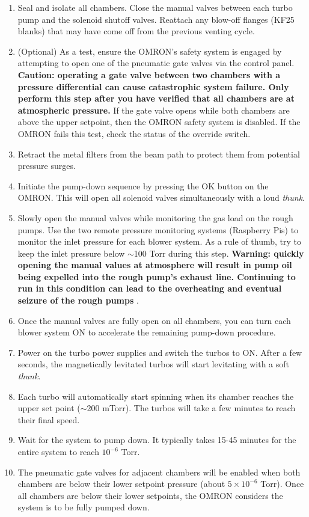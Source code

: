 \begin{enumerate}
	\item Seal and isolate all chambers. Close the manual valves between each turbo pump and the solenoid shutoff valves. Reattach any blow-off flanges (KF25 blanks) that may have come off from the previous venting cycle.
	\item (Optional) As a test, ensure the OMRON's safety system is engaged by attempting to open one of the pneumatic gate valves via the control panel. \textbf{Caution: operating a gate valve between two chambers with a pressure differential can cause catastrophic system failure. Only perform this step after you have verified that all chambers are at atmospheric pressure.} If the gate valve opens while both chambers are above the upper setpoint, then the OMRON safety system is disabled. If the OMRON fails this test, check the status of the override switch.
	\item Retract the metal filters from the beam path to protect them from potential pressure surges. 
	\item Initiate the pump-down sequence by pressing the OK button on the OMRON. This will open all solenoid valves simultaneously with a loud \textit{thunk}.
	\item Slowly open the manual valves while monitoring the gas load on the rough pumps. Use the two remote pressure monitoring systems (Raspberry Pis) to monitor the inlet pressure for each blower system. As a rule of thumb, try to keep the inlet pressure below $\sim$100 Torr during this step. \textbf{Warning: quickly opening the manual values at atmosphere will result in pump oil being expelled into the rough pump's exhaust line. Continuing to run in this condition can lead to the overheating and eventual seizure of the rough pumps} \cite{kiesewetterDynamicsNearThresholdAttosecond2019}.
	\item Once the manual valves are fully open on all chambers, you can turn each blower system ON to accelerate the remaining pump-down procedure.
	\item Power on the turbo power supplies and switch the turbos to ON. After a few seconds, the magnetically levitated turbos will start levitating with a soft \textit{thunk}.
	\item Each turbo will automatically start spinning when its chamber reaches the upper set point ($\sim$200 mTorr). The turbos will take a few minutes to reach their final speed.
	\item Wait for the system to pump down. It typically takes 15-45 minutes for the entire system to reach $10^{-6}$ Torr.
	\item The pneumatic gate valves for adjacent chambers will be enabled when both chambers are below their lower setpoint pressure (about $5 \times 10^{-6}$ Torr). Once all chambers are below their lower setpoints, the OMRON considers the system is to be fully pumped down.
\end{enumerate}

